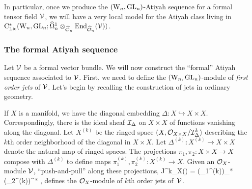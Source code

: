 \documentclass[10pt]{amsart}
\begin{document}
In particular, once we produce the $({{\rm W}_n}, {\rm GL}_n)$-Atiyah sequence for a formal tensor field $\mathcal{V}$, 
we will have a very local model for the Atiyah class living in ${\rm C}_{{\rm Lie}}^*({{\rm W}_n},{\rm GL}_n; \widehat{\Omega}^1_n \otimes_{\widehat{\mathcal O}_n} {\rm End}_{\widehat{\mathcal O}_n}(\mathcal{V}))$.



\subsubsection{The formal Atiyah sequence} \label{sec: formal atiyah}

Let $\mathcal{V}$ be a formal vector bundle. 
We will now construct the ``formal'' Atiyah sequence associated to $\mathcal{V}$.  
First, we need to define the $({{\rm W}_n}, {\rm GL}_n)$-module of {\em first order jets} of $\mathcal{V}$. 
Let's begin by recalling the construction of jets in ordinary geometry.

If $X$ is a manifold, we have the diagonal embedding $\Delta : X \hookrightarrow X \times X$. 
Correspondingly, there is the ideal sheaf $\mathcal I_\Delta$ on $X \times X$ of functions vanishing along the diagonal. 
Let $X^{(k)}$ be the ringed space $(X, \mathcal O_{X \times X}/\mathcal I_\Delta^k)$ 
describing the $k$th order neighborhood of the diagonal in $X \times X$. 
Let $\Delta^{(k)} : X^{(k)} \to X \times X$ denote the natural map of ringed spaces.
The projections $\pi_1, \pi_2 : X \times X \to X$ compose with $\Delta^{(k)}$ 
to define maps $\pi^{(k)}_1, \pi_2^{(k)} : X^{(k)} \to X$. 
Given an $\mathcal O_X$-module $\mathcal{V}$, 
``push-and-pull'' along these projections,
\ben
J^k_X(\cV) = (\pi_1^{(k)})_* (\pi_2^{(k)})^* \cV,
\een
defines the $\mathcal O_X$-module of $k$th order jets of~$\mathcal{V}$.
\end{document}
